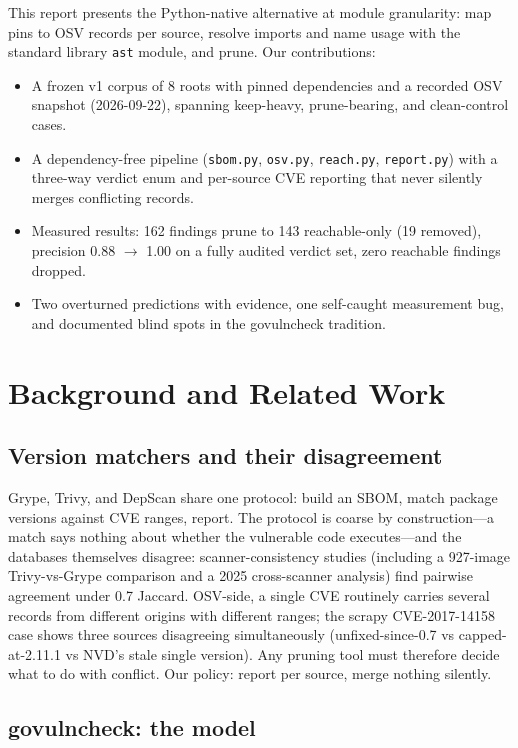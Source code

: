 \documentclass[11pt,a4paper]{article}
\begin{document}
This report presents the Python-native alternative at module granularity: map pins to OSV records per source, resolve imports and name usage with the standard library \verb!ast! module, and prune. Our contributions:

\begin{itemize}
    \item A frozen v1 corpus of 8 roots with pinned dependencies and a recorded OSV snapshot (2026-09-22), spanning keep-heavy, prune-bearing, and clean-control cases.
    \item A dependency-free pipeline (\verb!sbom.py!, \verb!osv.py!, \verb!reach.py!, \verb!report.py!) with a three-way verdict enum and per-source CVE reporting that never silently merges conflicting records.
    \item Measured results: 162 findings prune to 143 reachable-only (19 removed), precision 0.88 $\to$ 1.00 on a fully audited verdict set, zero reachable findings dropped.
    \item Two overturned predictions with evidence, one self-caught measurement bug, and documented blind spots in the govulncheck tradition.
\end{itemize}

\section{Background and Related Work}

\subsection{Version matchers and their disagreement}

Grype, Trivy, and DepScan share one protocol: build an SBOM, match package versions against CVE ranges, report. The protocol is coarse by construction---a match says nothing about whether the vulnerable code executes---and the databases themselves disagree: scanner-consistency studies (including a 927-image Trivy-vs-Grype comparison and a 2025 cross-scanner analysis) find pairwise agreement under 0.7 Jaccard. OSV-side, a single CVE routinely carries several records from different origins with different ranges; the scrapy CVE-2017-14158 case shows three sources disagreeing simultaneously (unfixed-since-0.7 vs capped-at-2.11.1 vs NVD's stale single version). Any pruning tool must therefore decide what to do with conflict. Our policy: report per source, merge nothing silently.

\subsection{govulncheck: the model}
\end{document}
